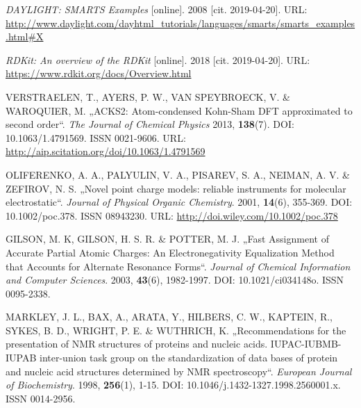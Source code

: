\begin{thebibliography}{10}
\textit{DAYLIGHT: SMARTS Examples} [online]. 2008 [cit. 2019-04-20]. URL: \url{ http://www.daylight.com/dayhtml_tutorials/languages/smarts/smarts_examples.html#X}

\textit{RDKit: An overview of the RDKit} [online]. 2018 [cit. 2019-04-20]. URL: \url{ https://www.rdkit.org/docs/Overview.html}

VERSTRAELEN, T., AYERS, P. W., VAN SPEYBROECK, V. \& WAROQUIER, M. „ACKS2: Atom-condensed Kohn-Sham DFT approximated to second order“. \textit{The Journal of Chemical Physics} 2013, \textbf{138}(7). DOI: 10.1063/1.4791569. ISSN 0021-9606. URL: \url{http://aip.scitation.org/doi/10.1063/1.4791569}

OLIFERENKO, A. A., PALYULIN, V. A., PISAREV, S. A., NEIMAN, A. V. \& ZEFIROV, N. S. „Novel point charge models: reliable instruments for molecular electrostatic“. \textit{Journal of Physical Organic Chemistry}. 2001, \textbf{14}(6), 355-369. DOI: 10.1002/poc.378. ISSN 08943230. URL: \url{ http://doi.wiley.com/10.1002/poc.378}

GILSON, M. K, GILSON, H. S. R. \& POTTER, M. J. „Fast Assignment of Accurate Partial Atomic Charges: An Electronegativity Equalization Method that Accounts for Alternate Resonance Forms“. \textit{Journal of Chemical Information and Computer Sciences}. 2003, \textbf{43}(6), 1982-1997. DOI: 10.1021/ci034148o. ISSN 0095-2338.

MARKLEY, J. L., BAX, A., ARATA, Y., HILBERS, C. W.,  KAPTEIN, R., SYKES, B. D., WRIGHT, P. E. \& WUTHRICH, K. „Recommendations for the presentation of NMR structures of proteins and nucleic acids. IUPAC-IUBMB-IUPAB inter-union task group on the standardization of data bases of protein and nucleic acid structures determined by NMR spectroscopy“. \textit{European Journal of Biochemistry}. 1998, \textbf{256}(1), 1-15. DOI: 10.1046/j.1432-1327.1998.2560001.x. ISSN 0014-2956. 

\end{thebibliography}


\cleardoublepage
